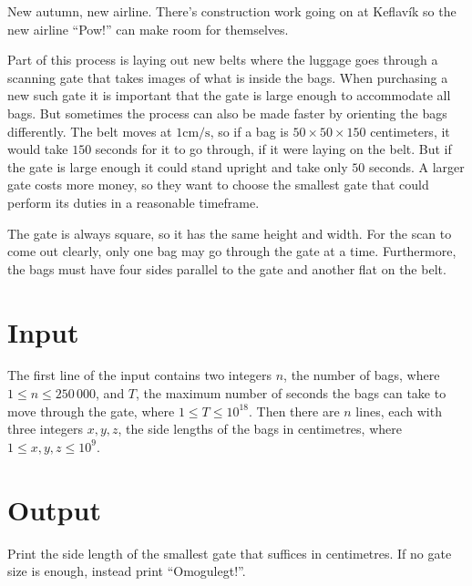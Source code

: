 
New autumn, new airline. There's construction work going on at Keflavík so the new airline
``Pow!'' can make room for themselves.

Part of this process is laying out new belts where the luggage goes through
a scanning gate that takes images of what is inside the bags. When purchasing a new such gate it is important that the gate is large
enough to accommodate all bags. But sometimes the process can also be made faster by orienting the bags differently.
The belt moves at $1 \mathrm{cm/s}$, so if a bag is $50 \times 50 \times 150$ centimeters, it would take $150$ seconds for it to go through, if
it were laying on the belt. But if the gate is large enough it could stand upright and take only $50$ seconds. A larger
gate costs more money, so they want to choose the smallest gate that could perform its duties in a reasonable timeframe.

The gate is always square, so it has the same height and width. For the scan to come out clearly, only one bag may go
through the gate at a time. Furthermore, the bags must have four sides parallel to the gate and another flat on the
belt.

\section*{Input}
The first line of the input contains two integers $n$, the number of bags,
where $1 \leq n \leq 250\,000$,
and $T$, the maximum number of seconds the bags can take to move through the gate,
where $1 \leq T \leq 10^{18}$.
Then there are $n$ lines, each with three integers $x, y, z$,
the side lengths of the bags in centimetres, where $1 \leq x, y, z \leq 10^9$.

\section*{Output}
Print the side length of the smallest gate that suffices in centimetres. If no gate size is enough, instead print
``Omogulegt!''.

